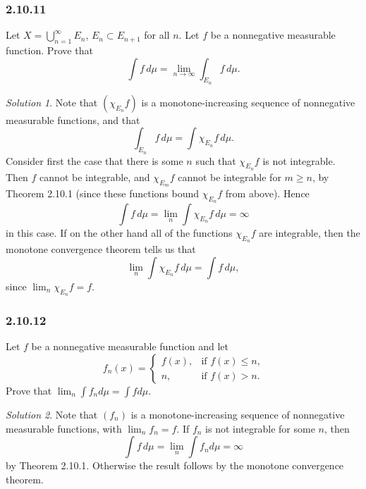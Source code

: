 \documentclass{report}
\theoremstyle{remark}
\newtheorem*{solution}{Solution}
\begin{document}
\subsubsection*{2.10.11}
Let $X = \bigcup_{n=1}^\infty E_n$, $E_n \subset E_{n+1}$ for all $n$. Let $f$ be a nonnegative measurable function. Prove that
\begin{equation*}
  \int f \, d\mu = \lim_{n \to \infty} \int_{E_n} f \, d\mu.
\end{equation*}

\begin{solution}
  Note that $(\chi_{E_n} f)$ is a monotone-increasing sequence of nonnegative measurable functions, and that
  \begin{equation*}
    \int_{E_n} f \, d\mu = \int \chi_{E_n} f \, d\mu.
  \end{equation*}
  Consider first the case that there is some $n$ such that $\chi_{E_n} f$ is not integrable. Then $f$ cannot be integrable, and $\chi_{E_m} f$ cannot be integrable for $m \ge n$, by Theorem 2.10.1 (since these functions bound $\chi_{E_n} f$ from above). Hence
  \begin{equation*}
    \int f \, d\mu = \lim_n \int \chi_{E_n} f \, d\mu = \infty
  \end{equation*}
  in this case. If on the other hand all of the functions $\chi_{E_n} f$ are integrable, then the monotone convergence theorem tells us that
  \begin{equation*}
    \lim_n \int \chi_{E_n} f \, d\mu = \int f \, d\mu,
  \end{equation*}
  since $ \lim_n \chi_{E_n} f = f$.
\end{solution}

\subsubsection*{2.10.12}
Let $f$ be a nonnegative measurable function and let
\begin{equation*}
  f_n(x) =
  \begin{cases}
    f(x), & \text{if $f(x) \le n$,} \\
    n, & \text{if $f(x) > n$.}
  \end{cases}
\end{equation*}
Prove that $\lim_n \int f_n d\mu = \int f d\mu$.

\begin{solution}
  Note that $(f_n)$ is a monotone-increasing sequence of nonnegative measurable functions, with $\lim_n f_n = f$. If $f_n$ is not integrable for some $n$, then
  \begin{equation*}
    \int f \, d\mu = \lim_n \int f_n d\mu = \infty
  \end{equation*}
  by Theorem 2.10.1. Otherwise the result follows by the monotone convergence theorem.
\end{solution}
\end{document}
